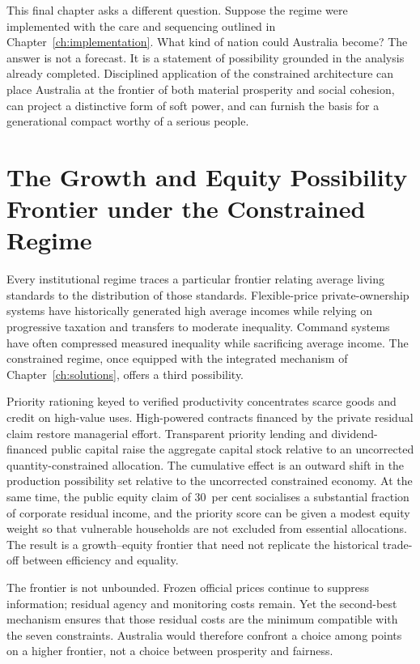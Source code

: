 \documentclass[12pt,anyside]{book}
\theoremstyle{definition}
\theoremstyle{plain}
\theoremstyle{remark}
\begin{document}
This final chapter asks a different question. Suppose the regime were implemented with the care and sequencing outlined in Chapter~\ref{ch:implementation}. What kind of nation could Australia become? The answer is not a forecast. It is a statement of possibility grounded in the analysis already completed. Disciplined application of the constrained architecture can place Australia at the frontier of both material prosperity and social cohesion, can project a distinctive form of soft power, and can furnish the basis for a generational compact worthy of a serious people.

\section{The Growth and Equity Possibility Frontier under the Constrained Regime}

Every institutional regime traces a particular frontier relating average living standards to the distribution of those standards. Flexible-price private-ownership systems have historically generated high average incomes while relying on progressive taxation and transfers to moderate inequality. Command systems have often compressed measured inequality while sacrificing average income. The constrained regime, once equipped with the integrated mechanism of Chapter~\ref{ch:solutions}, offers a third possibility.

Priority rationing keyed to verified productivity concentrates scarce goods and credit on high-value uses. High-powered contracts financed by the private residual claim restore managerial effort. Transparent priority lending and dividend-financed public capital raise the aggregate capital stock relative to an uncorrected quantity-constrained allocation. The cumulative effect is an outward shift in the production possibility set relative to the uncorrected constrained economy. At the same time, the public equity claim of 30~per cent socialises a substantial fraction of corporate residual income, and the priority score can be given a modest equity weight so that vulnerable households are not excluded from essential allocations. The result is a growth–equity frontier that need not replicate the historical trade-off between efficiency and equality.

The frontier is not unbounded. Frozen official prices continue to suppress information; residual agency and monitoring costs remain. Yet the second-best mechanism ensures that those residual costs are the minimum compatible with the seven constraints. Australia would therefore confront a choice among points on a higher frontier, not a choice between prosperity and fairness.
\end{document}
